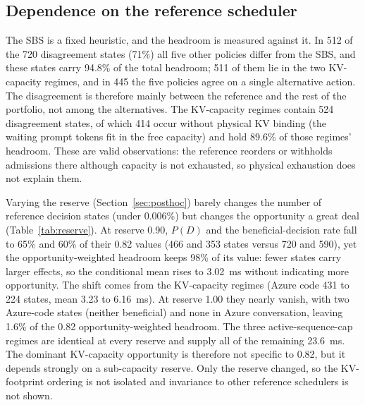 \documentclass[preprint,12pt]{elsarticle}
\begin{document}
\subsection{Dependence on the reference scheduler}
\label{sec:refdep}
The SBS is a fixed heuristic, and the headroom is measured against it. In 512 of
the 720 disagreement states (71\%) all five other policies differ from the SBS,
and these states carry 94.8\% of the total headroom; 511 of them lie in the two
KV-capacity regimes, and in 445 the five policies agree on a single alternative
action. The disagreement is therefore mainly between the reference and the rest
of the portfolio, not among the alternatives. The KV-capacity regimes contain 524
disagreement states, of which 414 occur without physical KV binding (the waiting
prompt tokens fit in the free capacity) and hold 89.6\% of those regimes'
headroom. These are valid observations: the reference reorders or withholds
admissions there although capacity is not exhausted, so physical exhaustion does
not explain them.

Varying the reserve (Section~\ref{sec:posthoc}) barely changes the number of
reference decision states (under 0.006\%) but changes the opportunity a great
deal (Table~\ref{tab:reserve}). At reserve 0.90, $P(D)$ and the
beneficial-decision rate fall to 65\% and 60\% of their 0.82 values (466 and 353
states versus 720 and 590), yet the opportunity-weighted headroom keeps 98\% of
its value: fewer states carry larger effects, so the conditional mean rises to
3.02~ms without indicating more opportunity. The shift comes from the
KV-capacity regimes (Azure code 431 to 224 states, mean 3.23 to 6.16~ms). At
reserve 1.00 they nearly vanish, with two Azure-code states (neither beneficial)
and none in Azure conversation, leaving 1.6\% of the 0.82 opportunity-weighted
headroom. The three active-sequence-cap regimes are identical at every reserve
and supply all of the remaining 23.6~ms. The dominant KV-capacity opportunity is
therefore not specific to 0.82, but it depends strongly on a sub-capacity
reserve. Only the reserve changed, so the KV-footprint ordering is not isolated
and invariance to other reference schedulers is not shown.
\end{document}
